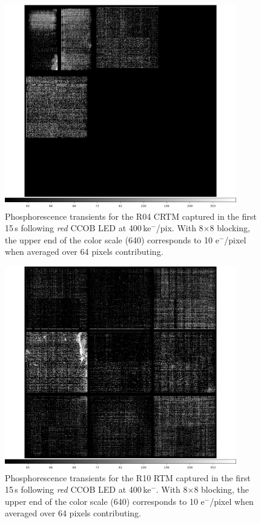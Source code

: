 \begin{figure}[!htbp]
\centering
\includegraphics[width=0.9\textwidth]{figures/phosphorescence-survey/itl_fluor_R04_0-19_rb1_log.png}
\caption{Phosphorescence transients for the R04 CRTM captured in the first 15\,s following {\it red} CCOB LED at 400\,ke$^-$/pix. With 8$\times$8 blocking, the upper end of the color scale (640) corresponds to 10 e$^-$/pixel when averaged over 64 pixels contributing.}
\label{fig:phos:R04}
\end{figure}

\begin{figure}[!htbp]
\centering
\includegraphics[width=0.9\textwidth]{figures/phosphorescence-survey/itl_fluor_R10_0-19_rb1_log.png}
\caption{Phosphorescence transients for the R10 RTM captured in the first 15\,s following {\it red} CCOB LED at 400\,ke$^-$. With 8$\times$8 blocking, the upper end of the color scale (640) corresponds to 10 e$^-$/pixel when averaged over 64 pixels contributing.}
\label{fig:phos:R10}
\end{figure}

